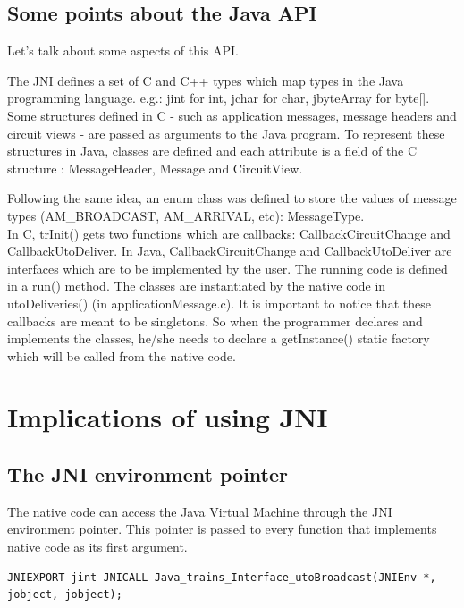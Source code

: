\documentclass[a4paper,10pt]{report}
\begin{document}
\subsection{Some points about the Java API}

Let's talk about some aspects of this API.

The JNI defines a set of C and C++ types which map types in the Java programming language.
e.g.: jint for int, jchar for char, jbyteArray for byte[].
Some structures defined in C - such as application messages, message headers and circuit views - are passed as arguments to the Java 
program. To represent these structures in Java, classes are defined and each attribute is a field of the C structure : MessageHeader, 
Message and CircuitView.

Following the same idea, an enum class was defined to store the values of message types (AM\_BROADCAST, AM\_ARRIVAL, etc): MessageType.\\

In C, trInit() gets two functions which are callbacks: CallbackCircuitChange and CallbackUtoDeliver.
In Java, CallbackCircuitChange and CallbackUtoDeliver are interfaces which are to be implemented by the user. The running code
is defined in a run() method. The classes are instantiated by the native code in utoDeliveries() (in applicationMessage.c).
It is important to notice that these callbacks are meant to be singletons. So when the programmer
declares and implements the classes, he/she needs to declare a getInstance() static factory which will be called from the native code.

\section{Implications of using JNI}

\subsection{The JNI environment pointer}

The native code can access the Java Virtual Machine through the JNI environment pointer. This pointer is passed to every function that
implements native code as its first argument.\\

\lstset{language=C}
\lstset{commentstyle=\textit} 
\begin{lstlisting}
JNIEXPORT jint JNICALL Java_trains_Interface_utoBroadcast(JNIEnv *, jobject, jobject);
\end{lstlisting}
\end{document}
